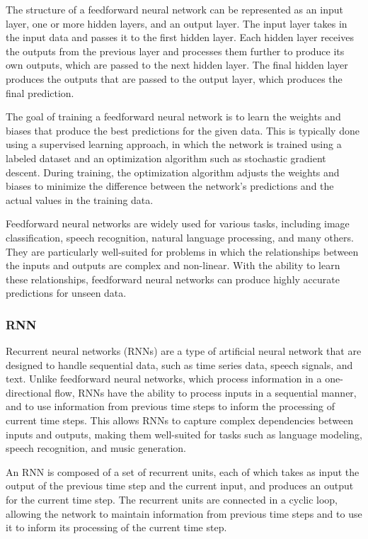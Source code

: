 \documentclass[12pt, a4paper, oneside]{article}
\begin{document}
The structure of a feedforward neural network can be represented as an input layer, one or more hidden layers, and an output layer. The input layer takes in the input data and passes it to the first hidden layer. Each hidden layer receives the outputs from the previous layer and processes them further to produce its own outputs, which are passed to the next hidden layer. The final hidden layer produces the outputs that are passed to the output layer, which produces the final prediction.

The goal of training a feedforward neural network is to learn the weights and biases that produce the best predictions for the given data. This is typically done using a supervised learning approach, in which the network is trained using a labeled dataset and an optimization algorithm such as stochastic gradient descent. During training, the optimization algorithm adjusts the weights and biases to minimize the difference between the network's predictions and the actual values in the training data.

Feedforward neural networks are widely used for various tasks, including image classification, speech recognition, natural language processing, and many others. They are particularly well-suited for problems in which the relationships between the inputs and outputs are complex and non-linear. With the ability to learn these relationships, feedforward neural networks can produce highly accurate predictions for unseen data.
\subsubsection{RNN}
Recurrent neural networks (RNNs) are a type of artificial neural network that are designed to handle sequential data, such as time series data, speech signals, and text. Unlike feedforward neural networks, which process information in a one-directional flow, RNNs have the ability to process inputs in a sequential manner, and to use information from previous time steps to inform the processing of current time steps. This allows RNNs to capture complex dependencies between inputs and outputs, making them well-suited for tasks such as language modeling, speech recognition, and music generation.

An RNN is composed of a set of recurrent units, each of which takes as input the output of the previous time step and the current input, and produces an output for the current time step. The recurrent units are connected in a cyclic loop, allowing the network to maintain information from previous time steps and to use it to inform its processing of the current time step.
\end{document}
